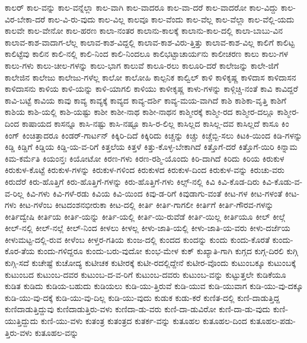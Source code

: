 {ಕಾಲರ್
ಕಾಲ-ವನ್ನು
ಕಾಲ-ವನ್ನೆಲ್ಲಾ
ಕಾಲ-ವಾಗಿ
ಕಾಲ-ವಾದರೂ
ಕಾಲ-ವಾ-ದರೆ
ಕಾಲ-ವಾದರೋ
ಕಾಲ-ವಿದ್ದು
ಕಾಲ-ವಿರ-ಬೇಕಾ-ದರೆ
ಕಾಲ-ವಿ-ರು-ವುದು
ಕಾಲ-ವಿಲ್ಲ
ಕಾಲವೂ
ಕಾಲ-ವೆಂದು
ಕಾಲ-ವೆಲ್ಲ
ಕಾಲ-ವೆಲ್ಲಾ
ಕಾಲ-ವೆಲ್ಲಿ-ಯದು
ಕಾಲವೇ
ಕಾಲ-ವೇನೋ
ಕಾಲ-ಹರಣ
ಕಾಲಾ-ನಂತರ
ಕಾಲಾನು-ಕಾಲಕ್ಕೆ
ಕಾಲಾನು-ಕಾಲ-ದಲ್ಲಿ
ಕಾಲಾ-ಬಾಬು-ವಿನ
ಕಾಲಾವ-ಕಾಶ-ವಾದಾಗ-ಲೆಲ್ಲ
ಕಾಲಾವ-ಕಾಶ-ವಿದ್ದಲ್ಲಿ
ಕಾಲಾವ-ಕಾಶ-ವಿರು-ತ್ತಿತ್ತು
ಕಾಲಾವ-ಕಾಶ-ವಿಲ್ಲ
ಕಾಲಿಗೆ
ಕಾಲಿಟ್ಟ
ಕಾಲಿಟ್ಟೆವು
ಕಾಲಿನ
ಕಾಲಿ-ನಲ್ಲಿ
ಕಾಲಿ-ನಿಂದ
ಕಾಲಿ-ನಿಂದಲೂ
ಕಾಲಿಭಟ್ಟಾಚಾರ್ಯನು
ಕಾಲೀಚರಣ
ಕಾಲು
ಕಾಲು-ಗಳ
ಕಾಲು-ಗಳು
ಕಾಲು-ಚೀಲ-ಗಳನ್ನು
ಕಾಲು-ಭಾಗ
ಕಾಲುವೆ
ಕಾಲೂ-ರಲು
ಕಾಲೂರಿ-ದರೆ
ಕಾಲೇಜನ್ನು
ಕಾಲೇ-ಜಿಗೆ
ಕಾಲೇಜಿನ
ಕಾಲೇಜು
ಕಾಲೇಜು-ಗಳೆಲ್ಲ
ಕಾಲೋ
ಕಾಲೋಹಿ
ಕಾಲ್ಪನಿಕ
ಕಾಲ್ವಿಲ್
ಕಾಳಿ
ಕಾಳಿಕೃಷ್ಣ
ಕಾಳಿದಾಸ
ಕಾಳಿದಾಸನ
ಕಾಳಿದಾಸನು
ಕಾಳಿಯ
ಕಾಳಿ-ಯನ್ನು
ಕಾಳಿ-ಯಾಗಲಿ
ಕಾಳಿಯು
ಕಾಳೀಕೃಷ್ಣ
ಕಾಳು-ಗಳನ್ನು
ಕಾಳ್ಗಿಚ್ಚಿ-ನಂತೆ
ಕಾವಿ
ಕಾವಿದ್ದರೆ
ಕಾವಿ-ಬಟ್ಟೆ
ಕಾವಿಯ
ಕಾವು
ಕಾವ್ಯ
ಕಾವ್ಯಕ್ಕೆ
ಕಾವ್ಯದ
ಕಾವ್ಯ-ದರ್ಶಿ
ಕಾವ್ಯ-ಮಯ-ವಾಗಿದೆ
ಕಾಶಿ
ಕಾಶಿಕಾ-ವೃತ್ತಿ
ಕಾಶಿಗೆ
ಕಾಶಿಯ
ಕಾಶಿ-ಯಲ್ಲಿ
ಕಾಶಿ-ಯಷ್ಟು
ಕಾಶೀ
ಕಾಶೀ-ನಾಥ
ಕಾಶೀ-ನಾಥನ
ಕಾಶ್ಮೀರಕ್ಕೆ
ಕಾಶ್ಮೀ-ರದ
ಕಾಶ್ಮೀರ-ದಲ್ಲೂ
ಕಾಶ್ಮೀರ-ದಿಂದ
ಕಾಷಾಯದ
ಕಾಸನ್ನೂ
ಕಾಸಿ-ನಷ್ಟು
ಕಾಸಿ-ನಷ್ಟೂ
ಕಾಸಿ-ರ-ಲಿಲ್ಲ
ಕಾಸಿಲ್ಲದ
ಕಾಸಿಲ್ಲ-ದವ
ಕಾಸಿಲ್ಲದೆ
ಕಾಸೂ
ಕಿಂ
ಕಿಂಗ್
ಕಿಂಚಿತ್ತಾದರೂ
ಕಿಂಡರ್-ಗಾರ್ಟನ್
ಕಿಕ್ಕಿರಿ-ದಿದೆ
ಕಿಕ್ಕಿರಿದು
ಕಿಚ್ಚನ್ನು
ಕಿಚ್ಚು
ಕಿಚ್ಚೆಬ್ಬಿ-ಸಲು
ಕಿಟಕಿ-ಯಿಂದ
ಕಿಡಿ-ಗಳನ್ನು
ಕಿಡ್ಡಿ
ಕಿಡ್ಡಿಗೆ
ಕಿಡ್ಡಿಯ
ಕಿಡ್ಡಿ-ಯ-ವ-ರಿಗೆ
ಕಿತ್ತಲೆಯ
ಕಿತ್ತಳೆ
ಕಿತ್ತು-ಕೊಳ್ಳ-ಬೇಕಾಗಿದೆ
ಕಿತ್ತೊಗೆ-ದರೆ
ಕಿತ್ತೊಗೆ-ಯಿರಿ
ಕಿನ್ನಾಮ
ಕಿಮ-ಕರ್ಮೆತಿ
ಕಿಯಂನ್ತಃ
ಕಿಯೋಟೋ
ಕಿರಣ-ಗಳು
ಕಿರಣ-ರಶ್ಮಿ-ಯೊಂದು
ಕಿರಿ-ದಾಗಿದೆ
ಕಿರಿದು
ಕಿರಿಯ
ಕಿರುಕುಳ
ಕಿರುಕುಳ-ಕೊಟ್ಟೆ
ಕಿರುಕುಳ-ಗಳನ್ನು
ಕಿರುಕುಳ-ಗಳಿಂದ
ಕಿರುಕುಳದ
ಕಿರುಕುಳ-ದಿಂದ
ಕಿರುಕುಳ-ವನ್ನು
ಕಿರುಚು-ವರು
ಕಿರುದೆರೆ
ಕಿರು-ಹೊತ್ತಿಗೆ
ಕಿರು-ಹೊತ್ತಿಗೆ-ಗಳನ್ನು
ಕಿರು-ಹೊತ್ತಿಗೆ-ಗಳು
ಕಿಲ್ಸ್-ನಲ್ಲಿ
ಕಿವಿ
ಕಿವಿ-ಕೊಡ-ದಿರು
ಕಿವಿ-ಕೊಡು-ವ-ವ-ರಿಲ್ಲ
ಕಿವಿ-ಗಳು
ಕಿವಿ-ಗಳೆ-ರಡು
ಕಿವಿಯ
ಕಿವಿ-ಯಿಂದ
ಕಿವು-ಡ-ರಿಗೆ
ಕಿವುಡಾಗು-ವಂತೆ
ಕೀಟ-ಗಳ
ಕೀಟ-ಗಳಂತೆ
ಕೀಟ-ಗಳು
ಕೀಟ-ಗಳೆಂಬ
ಕೀಟದಂಶನಭೀರುಕಾ
ಕೀಟ-ದಲ್ಲಿ
ಕೀರ್ತಿ
ಕೀರ್ತಿ-ಗಾಗಲೀ
ಕೀರ್ತಿಗೆ
ಕೀರ್ತಿ-ಗೌರವ-ಗಳನ್ನು
ಕೀರ್ತಿದ್ವೇಷಿ
ಕೀರ್ತಿಯ
ಕೀರ್ತಿ-ಯನ್ನು
ಕೀರ್ತಿ-ಯಲ್ಲಿ
ಕೀರ್ತಿ-ಯಿ-ರುವೆಡೆ
ಕೀರ್ತಿ-ಯಿಲ್ಲ
ಕೀರ್ತಿಯೂ
ಕೀಲ್
ಕೀಲ್ಗೆ
ಕೀಲ್-ನಲ್ಲಿ
ಕೀಲ್-ನಲ್ಲೆ
ಕೀಲ್-ನಿಂದ
ಕೀಳಲು
ಕೀಳಲ್ಲ
ಕೀಳು-ಜಾತಿ-ಯಲ್ಲಿ
ಕೀಳು-ಜಾತಿ-ಯ-ವರು
ಕೀಳು-ದರ್ಜೆಯ
ಕೀಳುಮಟ್ಟ-ದಲ್ಲಿ-ರುವ
ಕೀಳೆಂಬ
ಕೀಳ್ತರ-ಗತಿಯ
ಕುಂಜ-ದಲ್ಲಿ
ಕುಂದದ
ಕುಂದನ್ನು
ಕುಂದು
ಕುಂದು-ಕೊರತೆ
ಕುಂದು-ಕೊರ-ತೆಯ
ಕುಂದು-ಗಳಿದ್ದರೂ
ಕುಂದು-ಬರು-ವುದೋ
ಕುಂಭ-ಮೇಳ
ಕುಕ್
ಕುಖ್ಯಾತಿ-ಗಾಗಿ
ಕುಗ್ಗದ
ಕುಗ್ಗ-ದಿರಲಿ
ಕುಗ್ಗಿ
ಕುಗ್ಗಿ-ಸದೆ
ಕುಚೇಷ್ಟೆ
ಕುಚೋದ್ಯ
ಕುಟೀಚಕ
ಕುಟೀರಕ್ಕೆ
ಕುಟೀ-ರದಲ್ಲಿದ್ದೇನೆ
ಕುಟೀರ-ವೊಂದು
ಕುಟುಂಬಕ್ಕೂ
ಕುಟುಂಬಕ್ಕೆ
ಕುಟುಂಬದ
ಕುಟುಂಬ-ದವರ
ಕುಟುಂಬ-ದ-ವ-ರಿಗೆ
ಕುಟುಂಬ-ದವರು
ಕುಟುಂಬ-ವನ್ನು
ಕುಟ್ಟುತ್ತಲೇ
ಕುಡಿಕೆಯೂ
ಕುಡಿತ
ಕುಡಿದು
ಕುಡಿಯ-ಬಹುದು
ಕುಡಿಯಲು
ಕುಡಿ-ಯು-ತ್ತಿರುವೆ
ಕುಡಿ-ಯುವ
ಕುಡಿ-ಯುವಾಗ
ಕುಡಿ-ಯು-ವು-ದಕ್ಕೂ
ಕುಡಿ-ಯು-ವು-ದಕ್ಕೆ
ಕುಡಿ-ಯು-ವು-ದಿಲ್ಲ
ಕುಡಿ-ಯು-ವುದು
ಕುಡುಕ
ಕುಡು-ಕರೆ
ಕುಣಿತ-ದಲ್ಲಿ
ಕುಣಿ-ದಾಡುತ್ತಿದ್ದ
ಕುಣಿದಾಡುತ್ತಿದ್ದುವು
ಕುಣಿದಾಡುತ್ತಿರು-ವಳು
ಕುಣಿದಾ-ಡು-ವರು
ಕುಣಿ-ದಾ-ಡುವಿರೋ
ಕುಣಿ-ದಾ-ಡು-ವುದು
ಕುಣಿ-ಯುತ್ತಿದ್ದುದು
ಕುಣಿ-ಯು-ವಳು
ಕುತಂತ್ರ
ಕುತಂತ್ರದ
ಕುತರ್ಕ-ವನ್ನು
ಕುತೂಹಲ
ಕುತೂಹಲ-ದಿಂದ
ಕುತೂಹಲ-ಪಡು-ತ್ತಿರು-ವಳು
ಕುತೂಹಲ-ವನ್ನು
}
